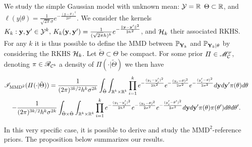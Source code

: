         We study the simple Gaussian model with unknown mean: $\mathcal{Y}=\mathbb{R}$ $\Theta\subset\mathbb{R} $, and $\ell(y|\theta)=\frac{1}{\sqrt{2\pi}\sigma}e^{-\frac{(y-\theta)^2}{2\sigma^2}}$. 
        We consider the kernels $K_k:\mathbf{y},\mathbf{y}'\in\mathcal{Y}^k,\,K_k(\mathbf{y},\mathbf{y}')= \frac{1}{(\sqrt{2\pi}h)^k}e^{-\frac{\|\mathbf{y}-\mathbf{y}'\|^2}{2h^2}}$, and $\mathcal{H}_k$ their associated RKHS. 
        For any $k$ it is thus possible to define the MMD between $\mathbb{P}_{\mathbf{Y}_k}$ and $\mathbb{P}_{\mathbf{Y}_k|\theta}$ by considering the RKHS $\mathcal{H}_k$.
        Let $\tilde\Theta\subset\Theta$ be compact. %
        For some prior $\varPi\in\mathscr{M}^\nu_{\mathcal{C}}$, denoting $\pi\in\mathscr{R}_{\mathcal{C}^b}$ a  density of $\varPi(\cdot|\tilde\Theta)$ we then have
            \begin{multline}
                \mathscr{I}_{\text{MMD}^2}(\varPi(\cdot|\tilde\Theta)) =\frac{1}{(2\pi)^{3k/2} h^k\sigma^{2k}} \int_{\tilde\Theta}\int_{\mathbb{R}^k\times\mathbb{R}^k} \prod_{i=1}^ke^{-\frac{(y_i-y_i')^2}{2h^2}} e^{-\frac{(y_i-\theta)^2}{2\sigma^2} } e^{-\frac{(y_i'-\theta)^2}{2\sigma^2} }  d\mathbf{y}d\mathbf{y}'\pi(\theta)d\theta \\
                - \frac{1}{(2\pi)^{3k/2}h^k\sigma^{2k}} \int_{\tilde\Theta\times\tilde\Theta}\int_{\mathbb{R}^k\times\mathbb{R}^k} \prod_{i=1}^ke^{-\frac{(y_i-y_i')^2}{2h^2}} e^{-\frac{(y_i-\theta)^2}{2\sigma^2} } e^{-\frac{(y_i'-\theta')^2}{2\sigma^2} }  d\mathbf{y}d\mathbf{y}'\pi(\theta)\pi(\theta')d\theta d\theta'.
            \end{multline}

    In this very specific case, it is possible to derive and study the $\text{MMD}^2$-reference priors. The proposition below summarizes our results.
    
